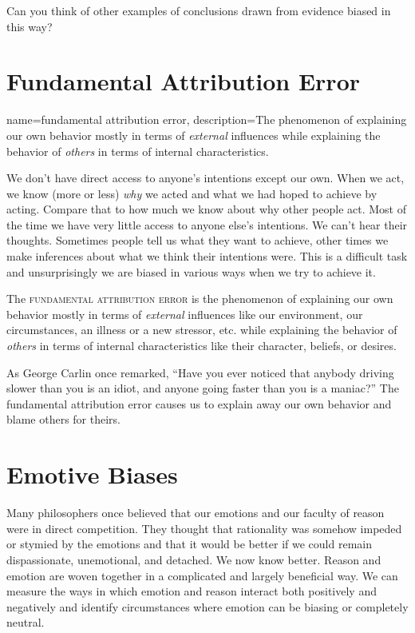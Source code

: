 Can you think of other examples of conclusions drawn from evidence biased in this way?

\section{Fundamental Attribution Error}

{
name=fundamental attribution error,
description={The phenomenon of explaining our own behavior mostly in terms of \emph{external} influences while explaining the behavior of \emph{others} in terms of internal characteristics.}
}

We don't have direct access to anyone's intentions except our own. When we act, we know (more or less) \emph{why} we acted and what we had hoped to achieve by acting. Compare that to how much we know about why other people act. Most of the time we have very little access to anyone else's intentions. We can't hear their thoughts. Sometimes people tell us what they want to achieve, other times we make inferences about what we think their intentions were. This is a difficult task and unsurprisingly we are biased in various ways when we try to achieve it.

The \textsc{\gls{fundamental attribution error}} is the phenomenon of explaining our own behavior mostly in terms of \emph{external} influences like our environment, our circumstances, an illness or a new stressor, etc. while explaining the behavior of \emph{others} in terms of internal characteristics like their character, beliefs, or desires.

As George Carlin once remarked, ``Have you ever noticed that anybody driving slower than you is an idiot, and anyone going faster than you is a maniac?'' The fundamental attribution error causes us to explain away our own behavior and blame others for theirs.

\section{Emotive Biases}

Many philosophers once believed that our emotions and our faculty of reason were in direct competition. They thought that rationality was somehow impeded or stymied by the emotions and that it would be better if we could remain dispassionate, unemotional, and detached. We now know better. Reason and emotion are woven together in a complicated and largely beneficial way. We can measure the ways in which emotion and reason interact both positively and negatively and identify circumstances where emotion can be biasing or completely neutral.

